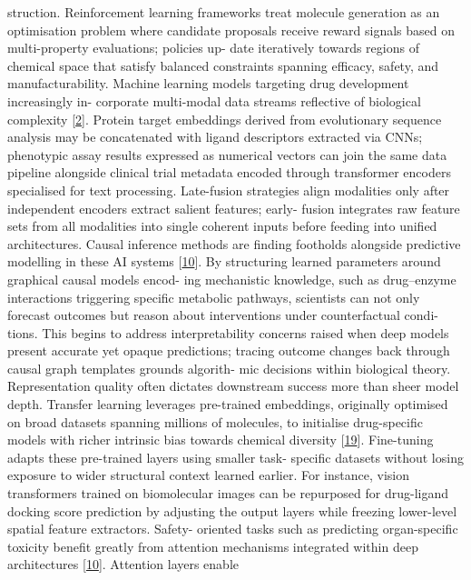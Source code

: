 \documentclass[
]{article}
\begin{document}
struction. Reinforcement learning frameworks treat molecule generation
as an optimisation problem where candidate proposals receive reward
signals based on multi-property evaluations; policies up- date
iteratively towards regions of chemical space that satisfy balanced
constraints spanning efficacy, safety, and manufacturability. Machine
learning models targeting drug development increasingly in- corporate
multi-modal data streams reflective of biological complexity
{[}\hyperref[_bookmark42]{2}{]}. Protein target embeddings derived from
evolutionary sequence analysis may be concatenated with ligand
descriptors extracted via CNNs; phenotypic assay results expressed as
numerical vectors can join the same data pipeline alongside clinical
trial metadata encoded through transformer encoders specialised for text
processing. Late-fusion strategies align modalities only after
independent encoders extract salient features; early- fusion integrates
raw feature sets from all modalities into single coherent inputs before
feeding into unified architectures. Causal inference methods are finding
footholds alongside predictive modelling in these AI systems
{[}\hyperref[_bookmark50]{10}{]}. By structuring learned parameters
around graphical causal models encod- ing mechanistic knowledge, such as
drug--enzyme interactions triggering specific metabolic pathways,
scientists can not only forecast outcomes but reason about interventions
under counterfactual condi- tions. This begins to address
interpretability concerns raised when deep models present accurate yet
opaque predictions; tracing outcome changes back through causal graph
templates grounds algorith- mic decisions within biological theory.
Representation quality often dictates downstream success more than sheer
model depth. Transfer learning leverages pre-trained embeddings,
originally optimised on broad datasets spanning millions of molecules,
to initialise drug-specific models with richer intrinsic bias towards
chemical diversity {[}\hyperref[_bookmark59]{19}{]}. Fine-tuning adapts
these pre-trained layers using smaller task- specific datasets without
losing exposure to wider structural context learned earlier. For
instance, vision transformers trained on biomolecular images can be
repurposed for drug-ligand docking score prediction by adjusting the
output layers while freezing lower-level spatial feature extractors.
Safety- oriented tasks such as predicting organ-specific toxicity
benefit greatly from attention mechanisms integrated within deep
architectures {[}\hyperref[_bookmark50]{10}{]}. Attention layers enable
\end{document}
